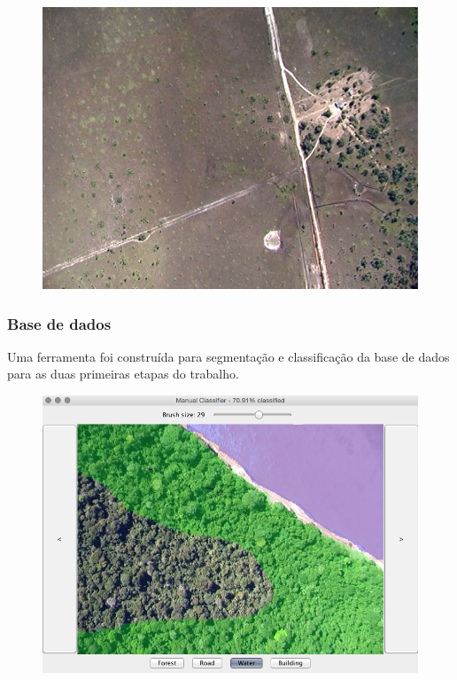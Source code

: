 \documentclass[t]{beamer}
\begin{document}
\begin{frame}
\begin{multicols}{3}
\begin{figure}
		\end{figure}
		\begin{figure}
			\includegraphics[scale=0.3]{imgs/amostra3}
		\end{figure}
	\end{multicols}

\end{frame}

\begin{frame}
	\frametitle{Base de dados}

	Uma ferramenta foi construída para segmentação e classificação da base de dados para as duas primeiras etapas do trabalho.

	\begin{figure}[h]
  		\centering
		\includegraphics[scale=0.25]{imgs/visualClassifier}
	\end{figure}
	
\end{frame}
\end{document}
